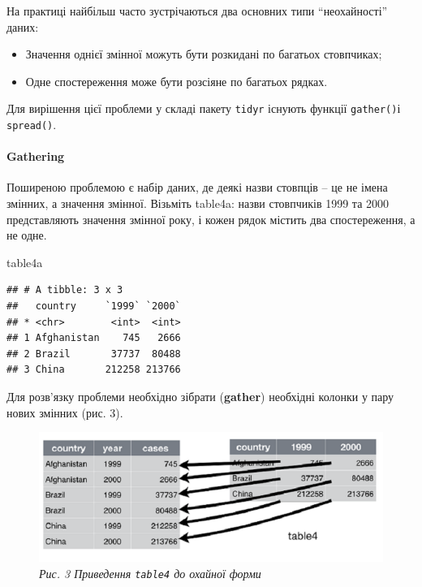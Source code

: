 \documentclass[
]{book}
\newenvironment{Shaded}{\begin{snugshade}}{\end{snugshade}}
\newcommand{\NormalTok}[1]{#1}
\providecommand{\tightlist}{%
  \setlength{\itemsep}{0pt}\setlength{\parskip}{0pt}}
\begin{document}
На практиці найбільш часто зустрічаються два основних типи ``неохайності'' даних:

\begin{itemize}
\tightlist
\item
  Значення однієї змінної можуть бути розкидані по багатьох стовпчиках;
\item
  Одне спостереження може бути розсіяне по багатьох рядках.
\end{itemize}

Для вирішення цієї проблеми у складі пакету \texttt{tidyr} існують функції \texttt{gather()}і \texttt{spread()}.

\hypertarget{gathering}{%
\paragraph{Gathering}\label{gathering}}

Поширеною проблемою є набір даних, де деякі назви стовпців -- це не імена змінних, а значення змінної. Візьміть table4a: назви стовпчиків 1999 та 2000 представляють значення змінної року, і кожен рядок містить два спостереження, а не одне.

\begin{Shaded}
\begin{Highlighting}[]
\NormalTok{table4a}
\end{Highlighting}
\end{Shaded}

\begin{verbatim}
## # A tibble: 3 x 3
##   country     `1999` `2000`
## * <chr>        <int>  <int>
## 1 Afghanistan    745   2666
## 2 Brazil       37737  80488
## 3 China       212258 213766
\end{verbatim}

Для розв'язку проблеми необхідно зібрати (\textbf{gather}) необхідні колонки у пару нових змінних (рис. 3).

\begin{figure}
\centering
\includegraphics{image/table4.png}
\caption{\emph{Рис. 3 Приведення \texttt{table4} до охайної форми}}
\end{figure}
\end{document}
